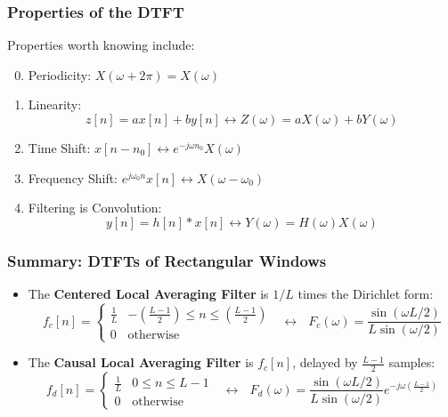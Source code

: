 \documentclass{beamer}
\begin{document}
\begin{frame}
  \frametitle{Properties of the DTFT}

  Properties worth knowing  include:
  \begin{enumerate}
    \setcounter{enumi}{-1}
  \item Periodicity: $X(\omega+2\pi)=X(\omega)$
  \item Linearity:
    \[z[n]=ax[n]+by[n]\leftrightarrow Z(\omega)=aX(\omega)+bY(\omega)
    \]
  \item Time Shift: $x[n-n_0]\leftrightarrow e^{-j\omega n_0}X(\omega)$
  \item Frequency Shift: $e^{j\omega_0 n}x[n]\leftrightarrow X(\omega-\omega_0)$
  \item Filtering is Convolution:
    \[
    y[n]=h[n]\ast x[n]\leftrightarrow Y(\omega)=H(\omega)X(\omega)
    \]
  \end{enumerate}
\end{frame}

\begin{frame}
  \frametitle{Summary: DTFTs of Rectangular Windows}
  \begin{itemize}
  \item The {\bf Centered Local Averaging Filter} is $1/L$ times
    the Dirichlet form:
    \[
    f_c[n] = \begin{cases}
      \frac{1}{L} & -\left(\frac{L-1}{2}\right)\le n\le \left(\frac{L-1}{2}\right)\\
      0 & \mbox{otherwise}
    \end{cases}~~~\leftrightarrow~~~
    F_c(\omega)=\frac{\sin(\omega L/2)}{L\sin(\omega/2)}
    \]
  \item The {\bf Causal Local Averaging Filter} is $f_c[n]$, delayed by $\frac{L-1}{2}$ samples:
    \[
    f_d[n] = \begin{cases}
      \frac{1}{L} & 0\le n\le L-1\\
      0 & \mbox{otherwise}
    \end{cases}~~~\leftrightarrow~~~
    F_d(\omega)=\frac{\sin(\omega L/2)}{L\sin(\omega/2)}e^{-j\omega\left(\frac{L-1}{2}\right)}
    \]
  \end{itemize}
\end{frame}
\end{document}
